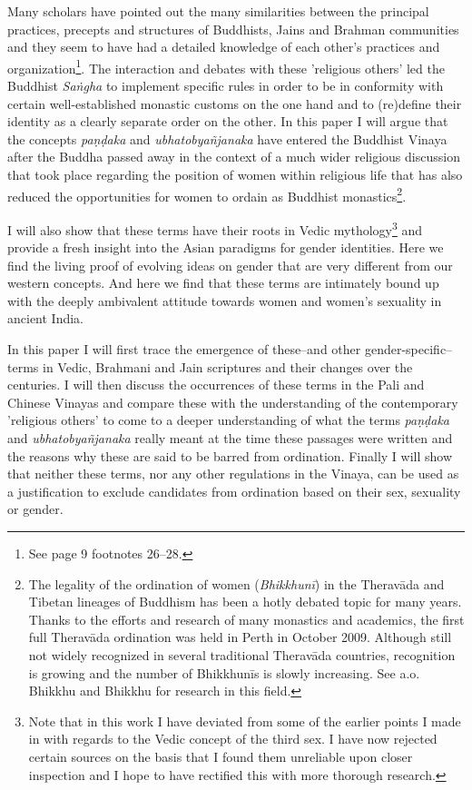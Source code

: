 Many scholars have pointed out the many similarities between the principal practices, precepts and structures of Buddhists, Jains and Brahman communities and they seem to have had a detailed knowledge of each other's practices and organization\footnote{See \cite{maes2016} page 9 footnotes 26–28.}. The interaction and debates with these 'religious others' led the Buddhist {\em Saṅgha} to implement specific rules in order to be in conformity with certain well-established monastic customs on the one hand and to (re)define their identity as a clearly separate order on the other. In this paper I will argue that the concepts {\em paṇḍaka} and {\em ubhatob­yañ­janaka} have entered the Buddhist Vinaya after the Buddha passed away in the context of a much wider religious discussion that took place regarding the position of women within religious life that has also reduced the opportunities for women to ordain as Buddhist monastics\footnote{The legality of the ordination of women ({\em Bhikkhunī}) in the Theravāda and Tibetan lineages of Buddhism has been a hotly debated topic for many years. Thanks to the efforts and research of many monastics and academics, the first full Theravāda ordination was held in Perth in October 2009. Although still not widely recognized in several traditional Theravāda countries, recognition is growing and the number of Bhikkhunīs is slowly increasing. See a.o. Bhikkhu \cite{sujato2009} and Bhikkhu \cite{analayo2013} for research in this field.}. 

I will also show that these terms have their roots in Vedic mythology\footnote{Note that in this work I have deviated from some of the earlier points I made in \cite{vimala} with regards to the Vedic concept of the third sex. I have now rejected certain sources on the basis that I found them unreliable upon closer inspection and I hope to have rectified this with more thorough research.} and provide a fresh insight into the Asian paradigms for gender identities. Here we find the living proof of evolving ideas on gender that are very different from our western concepts. And here we find that these terms are intimately bound up with the deeply ambivalent attitude towards women and women's sexuality in ancient India.

In this paper I will first trace the emergence of these--and other gender-specific--terms in Vedic, Brahmani and Jain scriptures and their changes over the centuries. I will then discuss the occurrences of these terms in the Pali and Chinese Vinayas and compare these with the understanding of the contemporary 'religious others' to come to a deeper understanding of what the terms {\em paṇḍaka} and {\em ubhatob­yañ­janaka} really meant at the time these passages were written and the reasons why these are said to be barred from ordination. Finally I will show that neither these terms, nor any other regulations in the Vinaya, can be used as a justification to exclude candidates from ordination based on their sex, sexuality or gender.


